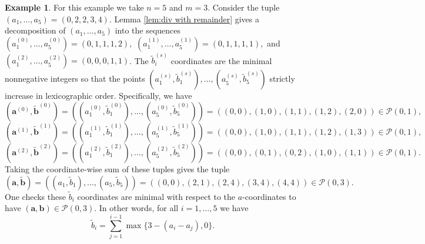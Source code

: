 \documentclass[12pt]{amsart}
\newcommand{\aaa}{\mathbf{a}}
\newcommand{\bbb}{\mathbf{b}}
\numberwithin{equation}{section}
\theoremstyle{definition}
\newtheorem{example}[theorem]{Example}
\begin{document}
\begin{example}\label{ex:decomp k=0}
    For this example we take $n=5$ and $m=3$. Consider the tuple $(a_1,\dots,a_5) = (0,2,2,3,4).$ Lemma \ref{lem:div with remainder} gives a decomposition of $(a_1,\dots,a_5)$ into the sequences $\left(a^{(0)}_1,\dots,a^{(0)}_5\right) = (0,1,1,1,2),$ $\left(a^{(1)}_1,\dots,a^{(1)}_5\right) = (0,1,1,1,1),$ and $\left(a^{(2)}_1,\dots,a^{(2)}_5\right) = (0,0,0,1,1)$. The $\widetilde{b}^{(s)}_i$ coordinates are the minimal nonnegative integers so that the points $\left(a^{(s)}_1,\widetilde{b}^{(s)}_1\right),\dots,\left(a^{(s)}_5,\widetilde{b}^{(s)}_5\right)$ strictly increase in lexicographic order. Specifically, we have
    \[ \left(\aaa^{(0)},\widetilde{\bbb}^{(0)}\right) = \left(\left(a^{(0)}_1,\widetilde{b}^{(0)}_1\right),\dots,\left(a^{(0)}_5,\widetilde{b}^{(0)}_5\right)\right) = ((0,0),(1,0),(1,1),(1,2),(2,0))\in \mathcal{P}(0,1), \]
    \[ \left(\aaa^{(1)},\widetilde{\bbb}^{(1)}\right) = \left(\left(a^{(1)}_1,\widetilde{b}^{(1)}_1\right),\dots,\left(a^{(1)}_5,\widetilde{b}^{(1)}_5\right)\right) = ((0,0),(1,0),(1,1),(1,2),(1,3))\in \mathcal{P}(0,1), \]
    \[ \left(\aaa^{(2)},\widetilde{\bbb}^{(2)}\right)=\left(\left(a^{(2)}_1,\widetilde{b}^{(2)}_1\right),\dots,\left(a^{(2)}_5,\widetilde{b}^{(2)}_5\right)\right) = ((0,0),(0,1),(0,2),(1,0),(1,1))\in \mathcal{P}(0,1). \]
    Taking the coordinate-wise sum of these tuples gives the tuple
    \[ \left(\aaa,\widetilde{\bbb}\right) =\left(\left(a_1,\widetilde{b}_1\right),\dots,\left(a_5,\widetilde{b}_5\right)\right) = ((0,0),(2,1),(2,4),(3,4),(4,4))\in \mathcal{P}(0,3). \]
    One checks these $\widetilde{b}_i$ coordinates are minimal with respect to the $a$-coordinates to have $(\aaa,\bbb)\in \mathcal{P}(0,3)$. In other words, for all $i=1,\dots,5$ we have 
    \[ \widetilde{b}_i = \sum_{j=1}^{i-1}\max\{ 3-(a_i-a_j),0 \}. \]
    

\end{example}
\end{document}
